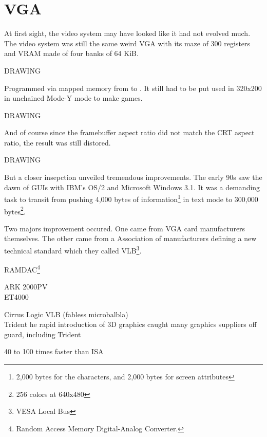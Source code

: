 \section{VGA}
At first sight, the video system may have looked like it had not evolved much.  The video system was still the same weird VGA with its maze of 300 registers and VRAM made of four banks of 64 KiB. 
\par
DRAWING
\par
Programmed via mapped memory from  to . It still had to be put used in 320x200 in unchained Mode-Y mode to make games.\\
\par
DRAWING
\par
And of course since the framebuffer aspect ratio did not match the CRT aspect ratio, the result was still distored.
\par
DRAWING
\par
But a closer insepction unveiled tremendous improvements. The early 90s saw the dawn of GUIs with IBM's OS/2 and Microsoft Windows 3.1. It was a demanding task to transit from pushing 4,000 bytes of information\footnote{2,000 bytes for the characters, and 2,000 bytes for screen attributes} in text mode to 300,000 bytes\footnote{256 colors at 640x480}.\\
\par
{}
\par
Two majors improvement occured. One came from VGA card manufacturers themselves. The other came from a Association of manufacturers defining a new technical standard which they called VLB\footnote{VESA Local Bus}.\\ 
\par


 
RAMDAC\footnote{Random Access Memory Digital-Analog Converter.}
\par
ARK 2000PV\\
ET4000\\
\par
Cirrus Logic VLB (fabless microbalbla)\\
Trident he rapid introduction of 3D graphics caught many graphics suppliers off guard, including Trident\\
\par
\par
40 to 100 times faster than ISA\\
\par
